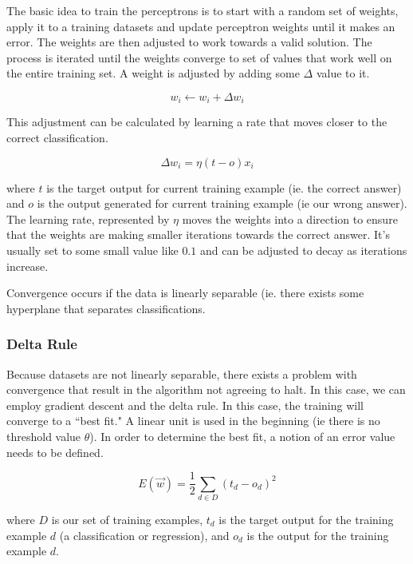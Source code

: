 \documentclass[11pt]{article}
\begin{document}
The basic idea to train the perceptrons is to start with a random set of weights, apply it to a training datasets and update perceptron weights until it makes an error. The weights are then adjusted to work towards a valid solution. The process is iterated until the weights converge to set of values that work well on the entire training set. A weight is adjusted by adding some $\Delta$ value to it.

\begin{equation}
w_i \leftarrow w_i + \Delta w_i
\end{equation}

This adjustment can be calculated by learning a rate that moves closer to the correct classification.

\begin{equation}
\Delta w_i=\eta (t-o) x_i
\end{equation}

where $t$ is the target output for current training example (ie. the correct answer) and $o$ is the output generated for current training example (ie our wrong answer). The learning rate, represented by $\eta$ moves the weights into a direction to ensure that the weights are making smaller iterations towards the correct answer. It's usually set to some small value like $0.1$ and can be adjusted to decay as iterations increase.

Convergence occurs if the data is linearly separable (ie. there exists some hyperplane that separates classifications.

\subsubsection*{Delta Rule}

Because datasets are not linearly separable, there exists a problem with convergence that result in the algorithm not agreeing to halt. In this case, we can employ gradient descent and the delta rule. In this case, the training will converge to a ``best fit." A linear unit is used in the beginning (ie there is no threshold value $\theta$). In order to determine the best fit, a notion of an error value needs to be defined.

\begin{equation}
E(\vec{w})=\frac{1}{2} \sum_{d \in D} (t_d - o_d)^2
\end{equation}

where $D$ is our set of training examples, $t_d$ is the target output for the training example $d$ (a classification or regression), and $o_d$ is the output for the training example $d$.
\end{document}

